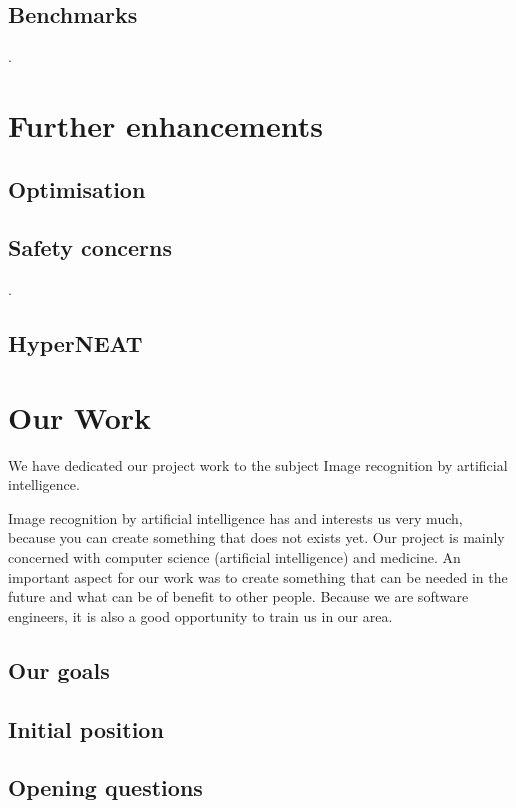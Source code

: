 \documentclass[11pt]{article}
\begin{document}
		\subsection{Benchmarks}
			.
	\newpage

	\section{Further enhancements}
		\subsection{Optimisation}
			
		\subsection{Safety concerns}
			.
		\subsection{HyperNEAT}
			
	\newpage

	\section{Our Work}
	We have dedicated our project work to the subject Image recognition by artificial intelligence.
	
	Image recognition by artificial intelligence has and interests us very much, because you can create something that does not exists yet. 
	Our project is mainly concerned with computer science (artificial intelligence) and medicine. 
	An important aspect for our work was to create something that can be needed in the future and what can be of benefit to other people. Because we are software engineers, it is also a good opportunity to train us in our area.
	
		
		\subsection{Our goals}
		
		\subsection{Initial position}
		
		\subsection{Opening questions}
		
\end{document}
